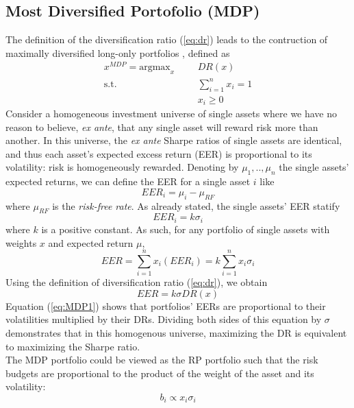 \subsection{Most Diversified Portofolio (MDP)}
The definition of the diversification ratio (\ref{eq:dr}) leads to the contruction of maximally diversified long-only portfolios \cite{diversification}, defined as
\begin{equation}
\begin{aligned}
x^{MDP} = \mbox{argmax}_x &&&DR(x)\\
\text{s.t.}&&&\sum_{i=1}^{n} x_i = 1\\ 
&&&x_i \geq 0
\end{aligned}
\end{equation}
Consider a homogeneous investment universe of single assets where we have no reason to believe, \textit{ex ante}, that any single asset will reward risk more than another. In this universe, the \textit{ex ante} Sharpe ratios of single assets are identical, and thus each asset’s expected excess return (EER) is proportional to its volatility: risk is homogeneously rewarded. Denoting by $\mu_1,..,\mu_n$ the single assets' expected returns, we can define the EER for a single asset $i$ like
\begin{equation}
EER_i = \mu_i - \mu_{RF}
\end{equation}
where $\mu_{RF}$ is the \textit{risk-free rate}. As already stated, the single assets' EER statify
\begin{equation}
EER_i = k\sigma_i
\end{equation}
where $k$ is a positive constant. As such, for any portfolio of single assets with weights $x$ and expected return $\mu$,
\begin{equation}
EER = \sum_{i=1}^{n} x_i (EER_i) = k \sum_{i=1}^n x_i \sigma_i
\end{equation}
Using the definition of diversification ratio (\ref{eq:dr}), we obtain
\begin{equation}\label{eq:MDP1}
EER = k \sigma DR(x)
\end{equation}
Equation (\ref{eq:MDP1}) shows that portfolios’ EERs are proportional to their volatilities multiplied by their DRs. Dividing both sides of this equation by $\sigma$ demonstrates that in this homogenous universe, maximizing the DR is equivalent to maximizing the Sharpe ratio.\\
The MDP portfolio could be viewed as the RP portfolio such that the risk budgets are proportional to the product of the weight of the asset and its volatility\footnotemark[2]:
\begin{equation*}
b_i \propto x_i \sigma_i
\end{equation*}
